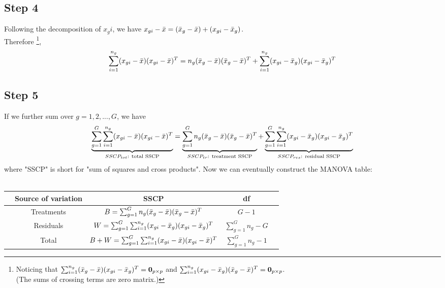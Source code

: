 \documentclass[12pt]{extarticle}
\newcommand{\<}{\langle}
\renewcommand{\>}{\rangle}
\theoremstyle{definition}
\begin{document}
\subsection{Step 4}
Following the decomposition of $x_gi$, we have $x_{gi} - \Bar{x} = (\Bar{x}_g -\Bar{x}) + (x_{gi} -\Bar{x}_g)$.\\
Therefore \footnote{Noticing that $\sum_{i=1}^{n_g} (\Bar{x}_g -\Bar{x})(x_{gi} -\Bar{x}_g)^T = {\bf 0}_{p \times p}$ and $\sum_{i=1}^{n_g} (x_{gi} -\Bar{x}_g)(\Bar{x}_g -\Bar{x})^T = {\bf 0}_{p \times p}$.\\  (The sums of crossing terms are zero matrix.)},
\begin{eqnarray*}
\sum_{i=1}^{n_g}(x_{gi} - \Bar{x})(x_{gi} - \Bar{x})^T = n_g (\Bar{x}_g -\Bar{x})(\Bar{x}_g -\Bar{x})^T + \sum_{i=1}^{n_g}(x_{gi} -\Bar{x}_g)(x_{gi} -\Bar{x}_g)^T
\end{eqnarray*}

\subsection{Step 5}
If we further sum over $g=1,2,...,G$, we have\\
\begin{eqnarray*}
\underbrace{\sum_{g=1}^G\sum_{i=1}^{n_g}(x_{gi} - \Bar{x})(x_{gi} - \Bar{x})^T}_\text{$SSCP_{tot}$: total SSCP} = \underbrace{\sum_{g=1}^G n_g (\Bar{x}_g -\Bar{x})(\Bar{x}_g -\Bar{x})^T}_\text{$SSCP_{tr}$: treatment SSCP} + \underbrace{\sum_{g=1}^G \sum_{i=1}^{n_g}(x_{gi} -\Bar{x}_g)(x_{gi} -\Bar{x}_g)^T}_\text{$SSCP_{res}$: residual SSCP}
\end{eqnarray*}
where "SSCP" is short for "sum of squares and cross products". Now we can eventually construct the MANOVA table: \\
\ \\ 
\begin{center}
  \begin{tabular*}{\textwidth}{@{\extracolsep{\fill}} ccccc @{}} \hline \hline
    & Source of variation & SSCP & df & \\ \hline 
    & Treatments & $B=\sum_{g=1}^G n_g (\Bar{x}_g -\Bar{x})(\Bar{x}_g -\Bar{x})^T$ & $G-1$  & \\
    & Residuals & $W=\sum_{g=1}^G \sum_{i=1}^{n_g}(x_{gi} -\Bar{x}_g)(x_{gi} -\Bar{x}_g)^T$ & $\sum_{g=1}^G n_g - G$  & \\ \hline
    & Total & $B+W=\sum_{g=1}^G\sum_{i=1}^{n_g}(x_{gi} - \Bar{x})(x_{gi} - \Bar{x})^T$ & $\sum_{g=1}^G n_g - 1$  & \\ \hline \hline
  \end{tabular*}
\end{center}
\end{document}
